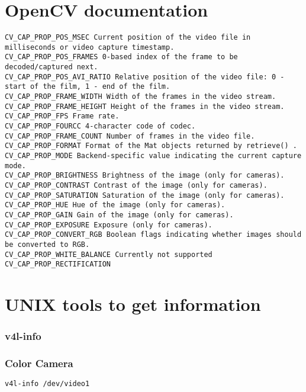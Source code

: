 \documentclass{article}
\begin{document}
\section{OpenCV documentation}
\begin{lstlisting}
CV_CAP_PROP_POS_MSEC Current position of the video file in milliseconds or video capture timestamp.
CV_CAP_PROP_POS_FRAMES 0-based index of the frame to be decoded/captured next.
CV_CAP_PROP_POS_AVI_RATIO Relative position of the video file: 0 - start of the film, 1 - end of the film.
CV_CAP_PROP_FRAME_WIDTH Width of the frames in the video stream.
CV_CAP_PROP_FRAME_HEIGHT Height of the frames in the video stream.
CV_CAP_PROP_FPS Frame rate.
CV_CAP_PROP_FOURCC 4-character code of codec.
CV_CAP_PROP_FRAME_COUNT Number of frames in the video file.
CV_CAP_PROP_FORMAT Format of the Mat objects returned by retrieve() .
CV_CAP_PROP_MODE Backend-specific value indicating the current capture mode.
CV_CAP_PROP_BRIGHTNESS Brightness of the image (only for cameras).
CV_CAP_PROP_CONTRAST Contrast of the image (only for cameras).
CV_CAP_PROP_SATURATION Saturation of the image (only for cameras).
CV_CAP_PROP_HUE Hue of the image (only for cameras).
CV_CAP_PROP_GAIN Gain of the image (only for cameras).
CV_CAP_PROP_EXPOSURE Exposure (only for cameras).
CV_CAP_PROP_CONVERT_RGB Boolean flags indicating whether images should be converted to RGB.
CV_CAP_PROP_WHITE_BALANCE Currently not supported
CV_CAP_PROP_RECTIFICATION 
\end{lstlisting}



\section{UNIX tools to get information}
\subsubsection{v4l-info}


\subsubsection{Color Camera}
\begin{lstlisting}[language=sh]
v4l-info /dev/video1
\end{lstlisting}
\end{document}

